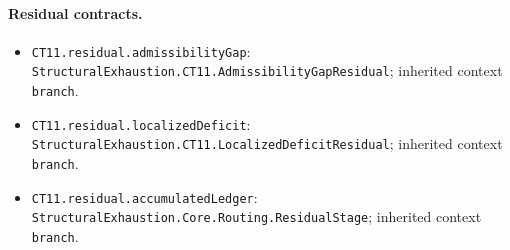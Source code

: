 \begingroup\small\sloppy
\paragraph{Residual contracts.}
\begin{itemize}
\item \texttt{CT11.\allowbreak{}residual.\allowbreak{}admissib\allowbreak{}ility\allowbreak{}Gap}: \texttt{Structural\allowbreak{}Exhaustion.\allowbreak{}CT11.\allowbreak{}Admissibility\allowbreak{}Gap\allowbreak{}Residual}; inherited context \texttt{branch}.
\item \texttt{CT11.\allowbreak{}residual.\allowbreak{}localized\allowbreak{}Deficit}: \texttt{Structural\allowbreak{}Exhaustion.\allowbreak{}CT11.\allowbreak{}Localized\allowbreak{}Deficit\allowbreak{}Residual}; inherited context \texttt{branch}.
\item \texttt{CT11.\allowbreak{}residual.\allowbreak{}accumulated\allowbreak{}Ledger}: \texttt{Structural\allowbreak{}Exhaustion.\allowbreak{}Core.\allowbreak{}Routing.\allowbreak{}Residual\allowbreak{}Stage}; inherited context \texttt{branch}.
\end{itemize}
\endgroup
